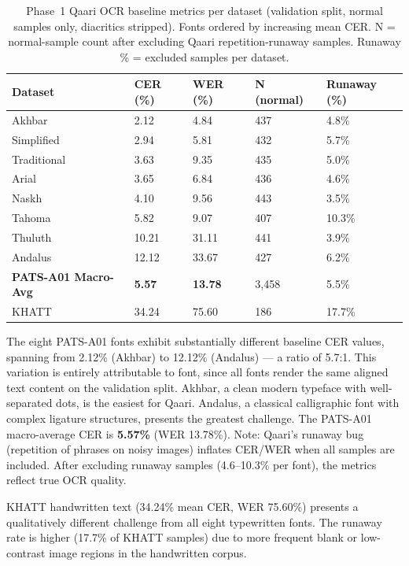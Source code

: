 \begin{table}[htbp]
  \centering
  \caption{Phase~1 Qaari OCR baseline metrics per dataset (validation split,
           normal samples only, diacritics stripped). Fonts ordered by
           increasing mean CER. N = normal-sample count after excluding Qaari
           repetition-runaway samples. Runaway \% = excluded samples per dataset.}
  \label{tab:p1_per_font}
  \begin{tabularx}{\textwidth}{lXXXX}
    \toprule
    \textbf{Dataset} & \textbf{CER (\%)} & \textbf{WER (\%)}
      & \textbf{N (normal)} & \textbf{Runaway (\%)} \\
    \midrule
    Akhbar       &  2.12 &  4.84 & 437 & 4.8\% \\
    Simplified   &  2.94 &  5.81 & 432 & 5.7\% \\
    Traditional  &  3.63 &  9.35 & 435 & 5.0\% \\
    Arial        &  3.65 &  6.84 & 436 & 4.6\% \\
    Naskh        &  4.10 &  9.56 & 443 & 3.5\% \\
    Tahoma       &  5.82 &  9.07 & 407 &10.3\% \\
    Thuluth      & 10.21 & 31.11 & 441 & 3.9\% \\
    Andalus      & 12.12 & 33.67 & 427 & 6.2\% \\
    \midrule
    \textbf{PATS-A01 Macro-Avg} & \textbf{5.57} & \textbf{13.78} & 3{,}458 & 5.5\% \\
    \midrule
    KHATT        & 34.24 & 75.60 & 186 & 17.7\% \\
    \bottomrule
  \end{tabularx}
\end{table}

The eight PATS-A01 fonts exhibit substantially different baseline CER values,
spanning from 2.12\% (Akhbar) to 12.12\% (Andalus) --- a ratio of 5.7:1.
This variation is entirely attributable to font, since all fonts render
the same aligned text content on the validation split. Akhbar, a clean modern
typeface with well-separated dots, is the easiest for Qaari. Andalus, a
classical calligraphic font with complex ligature structures, presents the
greatest challenge. The PATS-A01 macro-average CER is \textbf{5.57\%}
(WER 13.78\%). Note: Qaari's runaway bug (repetition of phrases on noisy
images) inflates CER/WER when all samples are included. After excluding
runaway samples (4.6--10.3\% per font), the metrics reflect true OCR quality.

KHATT handwritten text (34.24\% mean CER, WER 75.60\%) presents a
qualitatively different challenge from all eight typewritten fonts. The
runaway rate is higher (17.7\% of KHATT samples) due to more frequent
blank or low-contrast image regions in the handwritten corpus.

